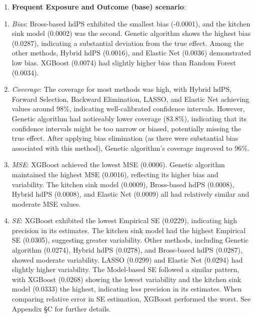 \documentclass[sn-vancouver,Numbered,lineno,pdflatex]{sn-jnl}
\providecommand{\tightlist}{%
  \setlength{\itemsep}{0pt}\setlength{\parskip}{0pt}}
\begin{document}
\begin{enumerate}
\def\labelenumi{(\roman{enumi})}
\tightlist
\item
  \textbf{Frequent Exposure and Outcome (base) scenario}:
\end{enumerate}

\begin{enumerate}
\def\labelenumi{\arabic{enumi}.}
\item
  \emph{Bias}: Bross-based hdPS exhibited the smallest bias (-0.0001),
  and the kitchen sink model (0.0002) was the second. Genetic algorithm
  shows the highest bias (0.0287), indicating a substantial deviation
  from the true effect. Among the other methods, Hybrid hdPS (0.0016),
  and Elastic Net (0.0036) demonstrated low bias. XGBoost (0.0074) had
  slightly higher bias than Random Forest (0.0034).
\item
  \emph{Coverage}: The coverage for most methods was high, with Hybrid
  hdPS, Forward Selection, Backward Elimination, LASSO, and Elastic Net
  achieving values around 98\%, indicating well-calibrated confidence
  intervals. However, Genetic algorithm had noticeably lower coverage
  (83.8\%), indicating that its confidence intervals might be too narrow
  or biased, potentially missing the true effect. After applying bias
  elimination (as there were substantial bias associated with this
  method), Genetic algorithm's coverage improved to 96\%.
\item
  \emph{MSE}: XGBoost achieved the lowest MSE (0.0006). Genetic
  algorithm maintained the highest MSE (0.0016), reflecting its higher
  bias and variability. The kitchen sink model (0.0009), Bross-based
  hdPS (0.0008), Hybrid hdPS (0.0008), and Elastic Net (0.0009) all had
  relatively similar and moderate MSE values.
\item
  \emph{SE}: XGBoost exhibited the lowest Empirical SE (0.0229),
  indicating high precision in its estimates. The kitchen sink model had
  the highest Empirical SE (0.0305), suggesting greater variability.
  Other methods, including Genetic algorithm (0.0274), Hybrid hdPS
  (0.0278), and Bross-based hdPS (0.0287), showed moderate variability.
  LASSO (0.0299) and Elastic Net (0.0294) had slightly higher
  variability. The Model-based SE followed a similar pattern, with
  XGBoost (0.0268) showing the lowest variability and the kitchen sink
  model (0.0333) the highest, indicating less precision in its
  estimates. When comparing relative error in SE estimation, XGBoost
  performed the worst. See Appendix \S C for further details.
\end{enumerate}
\end{document}
